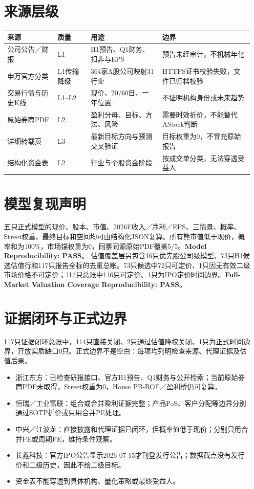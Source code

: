 \section{来源层级}

\begin{exhibitbox}
\begin{tabularx}{\textwidth}{L{2.1cm}L{2.4cm}L{3.4cm}X}
\toprule
\textbf{来源} & \textbf{质量} & \textbf{用途} & \textbf{边界} \\
\midrule
公司公告／财报 & L1 & H1预告、Q1财务、扣非与EPS & 预告未经审计，不机械年化 \\
申万官方分类 & L1传输降级 & 364家A股公司映射31行业 & HTTPS证书校验失败，文件已归档校验 \\
交易行情与历史K线 & L1--L2 & 现价、20/60日、一年位置 & 不证明机构身份或未来趋势 \\
原始券商PDF & L2 & 盈利分母、目标、方法、风险 & 需要时效折价，不能替代AStock判断 \\
详细转载页 & L3 & 最新目标方向与预测交叉验证 & 目标权重为0，不冒充原始报告 \\
结构化资金表 & L2 & 行业与个股资金阶段 & 按成交单分类，无法穿透受益人 \\
\bottomrule
\end{tabularx}
\end{exhibitbox}

\section{模型复现声明}

五只正式模型的现价、股本、市值、2026E收入／净利／EPS、三情景、概率、Street权重、最终目标和空间均可由结构化JSON复算。所有熊市值低于现价，概率和为100\%，市场锚权重为0，同票同源原始PDF覆盖5/5。\textbf{Model Reproducibility: PASS}。
估值覆盖层另包含16只优先股公司级模型、73只H1候选估值行和117只报告全标的去重总账。73只候选中72只可定价、1只因无有效二级市场价格不可定价；117只总账中116只可定价、1只为IPO定价时间边界。\textbf{Full-Market Valuation Coverage Reproducibility: PASS}。

\section{证据闭环与正式边界}

117只证据闭环总账中，114只直接关闭、2只通过估值降权关闭、1只为正式时间边界，开放实质缺口0只。正式边界不是空白：每项均列明检查来源、代理证据及估值后果。
\begin{itemize}
  \item 浙江东方：已检查研报接口、官方H1预告、Q1财务与公开检索；当前原始券商PDF未取得，Street权重为0，House PB-ROE／盈利桥仍可复算。
  \item 恒瑞／工业富联：组合或合并盈利证据完整；产品PoS、客户分配等边界分别通过SOTP折价或只用合并PE处理。
  \item 中兴／江波龙：直接披露和代理证据已闭环，但概率值低于现价；分别只用合并PE或周期PE，维持条件观察。
  \item 长鑫科技：官方IPO公告显示2026-07-15才刊登发行公告；数据截点没有发行价和二级历史，因此不给二级目标。
  \item 资金表不能穿透到具体机构、量化策略或最终受益人。
\end{itemize}
